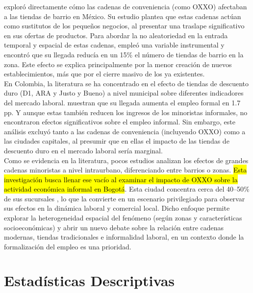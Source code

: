 \documentclass{article}
\begin{document}
\textcite{marcos2022} exploró directamente cómo las cadenas de conveniencia (como OXXO) afectaban a las tiendas de barrio en México. Su estudio plantea que estas cadenas actúan como sustitutos de los pequeños negocios, al presentar una traslape significativo en sus ofertas de productos. Para abordar la no aleatoriedad en la entrada temporal y espacial de estas cadenas, empleó una variable instrumental y encontró que su llegada reducía en un 15\% el número de tiendas de barrio en la zona. Este efecto se explica principalmente por la menor creación de nuevos establecimientos, más que por el cierre masivo de los ya existentes. \\

En Colombia, la literatura se ha concentrado en el efecto de tiendas de descuento duro (D1, ARA y Justo y Bueno) a nivel municipal sobre diferentes indicadores del mercado laboral. \textcite{delgado2024} muestran que su llegada aumenta el empleo formal en 1.7 pp. Y aunque estas también reducen los ingresos de los minoristas informales, no encontraron efectos significativos sobre el empleo informal. Sin embargo, este análisis excluyó tanto a las cadenas de conveniencia (incluyendo OXXO) como a las ciudades capitales, al presumir que en ellas el impacto de las tiendas de descuento duro en el mercado laboral sería marginal. \\

Como se evidencia en la literatura, pocos estudios analizan los efectos de grandes cadenas minoristas a nivel intraurbano, diferenciando entre barrios o zonas. \hl{Esta investigación busca llenar ese vacío al examinar el impacto de OXXO sobre la actividad económica informal en Bogotá}. Esta ciudad concentra cerca del 40–50\% de sus sucursales \parencite{godoy2025}, lo que la convierte en un escenario privilegiado para observar sus efectos en la dinámica laboral y comercial local. Dicho enfoque permite explorar la heterogeneidad espacial del fenómeno (según zonas y características socioeconómicas) y abrir un nuevo debate sobre la relación entre cadenas modernas, tiendas tradicionales e informalidad laboral, en un contexto donde la formalización del empleo es una prioridad.\\

\section{Estadísticas Descriptivas} 
\end{document}
